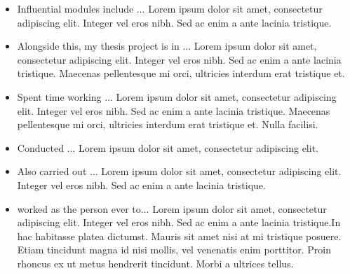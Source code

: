 \documentclass[10pt,a4paper]{altacv}
\begin{document}


\makecvheader


\begin{itemize}
\item Influential modules include ... Lorem ipsum dolor sit amet, consectetur adipiscing elit. Integer vel eros nibh. Sed ac enim a ante lacinia tristique.
\item Alongside this, my thesis project is in ...  Lorem ipsum dolor sit amet, consectetur adipiscing elit. Integer vel eros nibh. Sed ac enim a ante lacinia tristique. Maecenas pellentesque mi orci, ultricies interdum erat tristique et.
\end{itemize}


\begin{itemize}
\item Spent time working ... Lorem ipsum dolor sit amet, consectetur adipiscing elit. Integer vel eros nibh. Sed ac enim a ante lacinia tristique. Maecenas pellentesque mi orci, ultricies interdum erat tristique et. Nulla facilisi. 
\item Conducted ... Lorem ipsum dolor sit amet, consectetur adipiscing elit. 
\item Also carried out ... Lorem ipsum dolor sit amet, consectetur adipiscing elit. Integer vel eros nibh. Sed ac enim a ante lacinia tristique. 
\end{itemize}

\begin{itemize}
\item worked as the  person ever to... Lorem ipsum dolor sit amet, consectetur adipiscing elit. Integer vel eros nibh. Sed ac enim a ante lacinia tristique.In hac habitasse platea dictumst. Mauris sit amet nisi at mi tristique posuere. Etiam tincidunt magna id nisi mollis, vel venenatis enim porttitor. Proin rhoncus ex ut metus hendrerit tincidunt. Morbi a ultrices tellus. 
\end{itemize}
\end{document}
